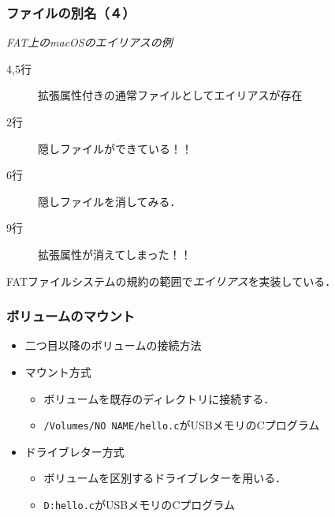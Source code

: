 \documentclass{beamer}                   %
\begin{document}
\begin{frame}
  \frametitle{ファイルの別名（４）}
  \emph{FAT上のmacOSのエイリアスの例}
  \begin{quote}
  \end{quote}
  \begin{description}
    \item[4,5行] 拡張属性付きの通常ファイルとしてエイリアスが存在
    \item[2行]   隠しファイルができている！！
    \item[6行]   隠しファイルを消してみる．
    \item[9行]   拡張属性が消えてしまった！！
  \end{description}
  FATファイルシステムの規約の範囲で\emph{エイリアス}を実装している．
  \vfill
\end{frame}

\begin{frame}
  \frametitle{ボリュームのマウント}
  \begin{itemize}
  \item 二つ目以降のボリュームの接続方法
  \item マウント方式
    \begin{itemize}
    \item ボリュームを既存のディレクトリに接続する．
    \item \texttt{/Volumes/NO NAME/hello.c}がUSBメモリのCプログラム
    \end{itemize}
  \item ドライブレター方式
    \begin{itemize}
    \item ボリュームを区別するドライブレターを用いる．
    \item \texttt{D:{\bs}hello.c}がUSBメモリのCプログラム
    \end{itemize}
  \end{itemize}
\end{frame}
\end{document}
